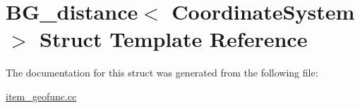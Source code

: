 \hypertarget{structBG__distance}{}\section{B\+G\+\_\+distance$<$ Coordinate\+System $>$ Struct Template Reference}
\label{structBG__distance}


The documentation for this struct was generated from the following file\+:\begin{DoxyCompactItemize}
\item 
\mbox{\hyperlink{item__geofunc_8cc}{item\+\_\+geofunc.\+cc}}\end{DoxyCompactItemize}
